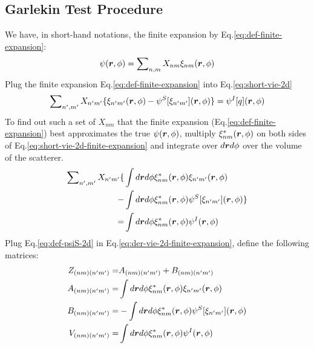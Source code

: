 \documentclass [10pt,letterpaper]{article}
\begin{document}
\subsection{Garlekin Test Procedure}
\label{sub:garlekin-test-procedure}
We have, in short-hand notations, the finite expansion by Eq.\eqref{eq:def-finite-expansion}:
\begin{equation} \label{eq:short-fintie-expansion}
	\psi(\vectorsym{r},\phi)=\sum\nolimits_{n,m}X_{n m}\xi_{n m}(\vectorsym{r},\phi)
\end{equation}
Plug the finite expansion Eq.\eqref{eq:def-finite-expansion} into Eq.\eqref{eq:short-vie-2d}
\begin{equation} \label{eq:short-vie-2d-finite-expansion}
	\sum\nolimits_{n^\prime,m^\prime}
	X_{n^\prime m^\prime}
	\{
		\xi_{n^\prime m^\prime}(\vectorsym{r},\phi)
		-\psi^S[\xi_{n^\prime m^\prime}](\vectorsym{r},\phi)
	\}
	=\psi^I[q](\vectorsym{r},\phi)
\end{equation}
To find out such a set of $X_{n m}$ that the finite expansion (Eq.\eqref{eq:def-finite-expansion}) best approximates the true $\psi(\vectorsym{r},\phi)$, multiply $\xi^*_{n m}(\vectorsym{r},\phi)$ on both sides of Eq.\eqref{eq:short-vie-2d-finite-expansion} and integrate over $d\vectorsym{r}d\phi$ over the volume of the scatterer.
\begin{equation} \label{eq:der-vie-2d-finite-expansion}
	\begin{split}
		\sum\nolimits_{n^\prime,m^\prime}
		X_{n^\prime m^\prime}
		\{&
			\int d\vectorsym{r} d\phi
			\xi^*_{n m}(\vectorsym{r},\phi)
			\xi_{n^\prime m^\prime}(\vectorsym{r},\phi)
			\\
		-&
			\int d\vectorsym{r} d\phi
			\xi^*_{n m}(\vectorsym{r},\phi)
			\psi^S[\xi_{n^\prime m^\prime}](\vectorsym{r},\phi)
		\}
		\\
		=&
		\int d\vectorsym{r} d\phi
		\xi^*_{n m}(\vectorsym{r},\phi)
		\psi^I(\vectorsym{r},\phi)
		\end{split}
\end{equation}
Plug Eq.\eqref{eq:def-psiS-2d} in Eq.\eqref{eq:der-vie-2d-finite-expansion}, define the following matrices:
\begin{align} \label{eq:def-Z-A-B-V}
	Z_{(n m)(n^\prime m^\prime)}
	=&
	A_{(n m)(n^\prime m^\prime)}
	+B_{(n m)(n^\prime m^\prime)}
	\\
	A_{(n m)(n^\prime m^\prime)}
	=&
	\int d\vectorsym{r}d\phi
	\xi^*_{n m}(\vectorsym{r},\phi)
	\xi_{n^\prime m^\prime}
	(\vectorsym{r},\phi)
	\\
	B_{(n m)(n^\prime m^\prime)}
	=&
	-\int d\vectorsym{r}d\phi
	\xi^*_{n m}(\vectorsym{r},\phi)
	\psi^S
	[\xi_{n^\prime m^\prime}]
	(\vectorsym{r},\phi)
	\\
	V_{(n m)(n^\prime m^\prime)}
	=&
	\int d\vectorsym{r}d\phi
	\xi^*_{n m}(\vectorsym{r},\phi)
	\psi^I(\vectorsym{r},\phi) 
\end{align}
\end{document}
